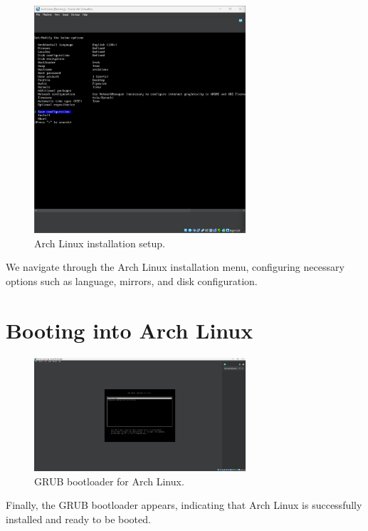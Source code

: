 \documentclass{article}
\begin{document}
\begin{figure}[H]
    \centering
    \includegraphics[width=0.7\textwidth]{9.png}
    \caption{Arch Linux installation setup.}
\end{figure}

We navigate through the Arch Linux installation menu, configuring necessary options such as language, mirrors, and disk configuration.

\section{Booting into Arch Linux}
\begin{figure}[H]
    \centering
    \includegraphics[width=0.7\textwidth]{10.png}
    \caption{GRUB bootloader for Arch Linux.}
\end{figure}

Finally, the GRUB bootloader appears, indicating that Arch Linux is successfully installed and ready to be booted.
\end{document}
